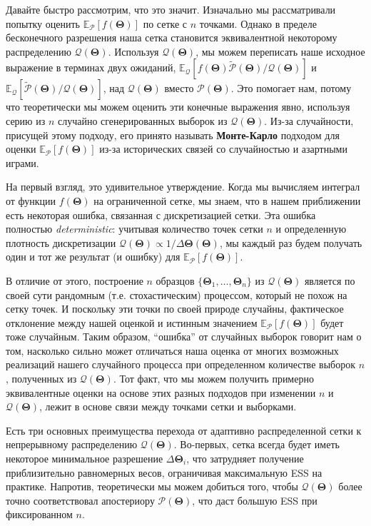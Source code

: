\documentclass[12pt, titlepage]{article}
\newcommand{\meanwrt}[2]{\ensuremath{\mathbb{E}_{{#2}}\left[{#1}\right]}}
\newcommand{\params}{\ensuremath{\boldsymbol\Theta}}
\newcommand{\posterior}{\ensuremath{\mathcal{P}}}
\newcommand{\proposal}{\ensuremath{\mathcal{Q}}}
\begin{document}
Давайте быстро рассмотрим, что это значит. Изначально мы рассматривали попытку оценить $\meanwrt{f(\params)}{\posterior}$ по сетке с $n$ точками. Однако в пределе бесконечного разрешения наша сетка становится эквивалентной некоторому распределению $\proposal(\params)$. Используя $\proposal(\params)$, мы можем переписать наше исходное выражение в терминах двух ожиданий, $\meanwrt{f(\params)\tilde{\posterior}(\params)/\proposal(\params)}{\proposal}$ и $\meanwrt{\tilde{\posterior}(\params)/\proposal(\params)}{\proposal}$, над $\proposal(\params)$ вместо $\posterior(\params)$. Это помогает нам, потому что теоретически мы можем оценить эти конечные выражения явно, используя серию из $n$ случайно сгенерированных выборок из $\proposal(\params)$. Из-за случайности, присущей этому подходу, его принято называть \textbf{Монте-Карло} подходом для оценки $\meanwrt{f(\params)}{\posterior}$ из-за исторических связей со случайностью и азартными играми.

На первый взгляд, это удивительное утверждение. Когда мы вычисляем интеграл от функции $f(\params)$ на ограниченной сетке, мы знаем, что в нашем приближении есть некоторая ошибка, связанная с дискретизацией сетки. Эта ошибка полностью \textit{deterministic}: учитывая количество точек сетки $n$ и определенную плотность дискретизации $\proposal(\params)\propto 1/\Delta\params(\params)$, мы каждый раз будем получать один и тот же результат (и ошибку) для $\meanwrt{f(\params)}{\posterior}$.

В отличие от этого, построение $n$ образцов $\{\params_1,\dots,\params_n\}$ из $\proposal(\params)$ является по своей сути рандомным (т.е. стохастическим) процессом, который не похож на сетку точек. И поскольку эти точки по своей природе случайны, фактическое отклонение между нашей оценкой и истинным значением $\meanwrt{f(\params)}{\posterior}$ будет тоже случайным. Таким образом, ``ошибка'' от случайных выборок говорит нам о том, насколько сильно может отличаться наша оценка от многих возможных реализаций нашего случайного процесса при определенном количестве выборок $n$, полученных из $\proposal(\params)$. Тот факт, что мы можем получить примерно эквивалентные оценки на основе этих разных подходов при изменении $n$ и $\proposal(\params)$, лежит в основе связи между точками сетки и выборками.

Есть три основных преимущества перехода от адаптивно распределенной сетки к непрерывному распределению $\proposal(\params)$. Во-первых, сетка всегда будет иметь некоторое минимальное разрешение $\Delta \params_i$, что затрудняет получение приблизительно равномерных весов, ограничивая максимальную ESS на практике. Напротив, теоретически мы можем добиться того, чтобы $\proposal(\params)$ более точно соответствовал апостериору $\posterior(\params)$, что даст большую ESS при фиксированном $n$.
\end{document}
